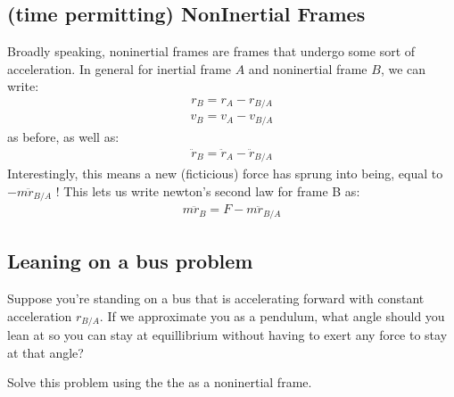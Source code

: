 \documentclass[letterpaper,10pt,english]{jupyterBook}
\begin{document}
\subsection{(time permitting) Non\sphinxhyphen{}Inertial Frames}
\label{\detokenize{content/1_mechanics/frames:time-permitting-non-inertial-frames}}
\sphinxAtStartPar
Broadly speaking, non\sphinxhyphen{}inertial frames are frames that undergo some sort of acceleration. In general for inertial frame \(A\) and non\sphinxhyphen{}inertial frame \(B\), we can write:
\begin{equation*}
\begin{split}r_B = r_A - r_{B/A}\end{split}
\end{equation*}\begin{equation*}
\begin{split}v_B = v_A - v_{B/A}\end{split}
\end{equation*}
\sphinxAtStartPar
as before, as well as:
\begin{equation*}
\begin{split}\ddot{r}_B = \ddot{r}_{A} - \ddot{r}_{B/A}\end{split}
\end{equation*}
\sphinxAtStartPar
Interestingly, this means a new (ficticious) force has sprung into being, equal to \(-m\ddot{r}_{B/A}\) ! This lets us write newton’s second law for frame B as:
\begin{equation*}
\begin{split}m\ddot{r}_{B} = F -m\ddot{r}_{B/A}\end{split}
\end{equation*}

\subsection{Leaning on a bus problem}
\label{\detokenize{content/1_mechanics/frames:leaning-on-a-bus-problem}}
\sphinxAtStartPar
Suppose you’re standing on a bus that is accelerating forward with constant acceleration \(r_{B/A}\). If we approximate you as a pendulum, what angle should you lean at so you can stay at equillibrium without having to exert any force to stay at that angle?

\sphinxAtStartPar
{}

\sphinxAtStartPar
Solve this problem using the the as a non\sphinxhyphen{}inertial frame. 
\end{document}
